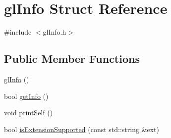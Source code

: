 \hypertarget{structglInfo}{\section{gl\-Info Struct Reference}
\label{structglInfo}
}


{\ttfamily \#include $<$gl\-Info.\-h$>$}

\subsection*{Public Member Functions}
\begin{DoxyCompactItemize}
\item 
\hyperlink{structglInfo_a0e1a3233ed1bf13d40e2392358bd9179}{gl\-Info} ()
\item 
bool \hyperlink{structglInfo_a15576e01d26b015a1e1e9fb71437c101}{get\-Info} ()
\item 
void \hyperlink{structglInfo_aea08606b991de4d4975dd14e9bcd1a0c}{print\-Self} ()
\item 
bool \hyperlink{structglInfo_afb450582bfc8d67eb3714a785b104602}{is\-Extension\-Supported} (const std\-::string \&ext)
\end{DoxyCompactItemize}
